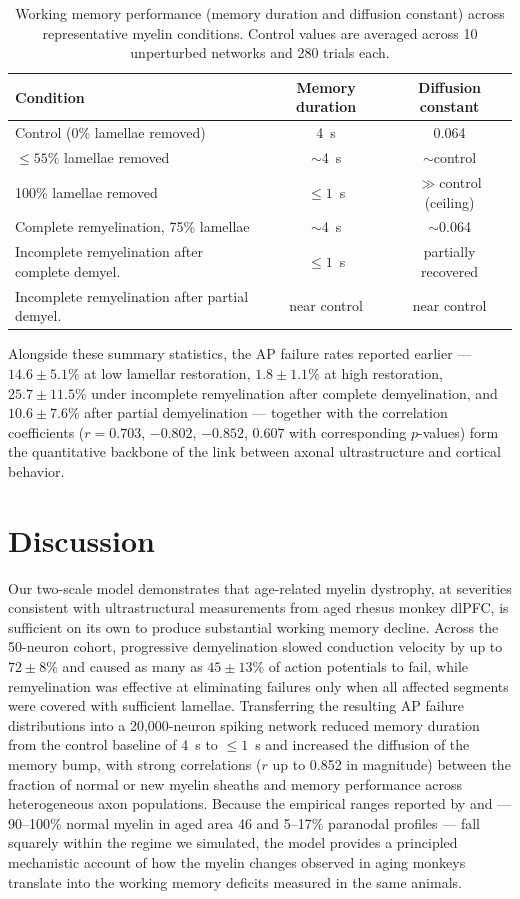 \documentclass[11pt]{article}
\begin{document}
\begin{table}[htbp]
\centering
\caption{Working memory performance (memory duration and diffusion constant) across representative myelin conditions. Control values are averaged across 10 unperturbed networks and 280 trials each.}
\label{tab:memory}
\begin{tabular}{lcc}
\toprule
Condition & Memory duration & Diffusion constant \\
\midrule
Control (0\% lamellae removed) & 4~s & 0.064 \\
$\leq 55\%$ lamellae removed & $\sim$4~s & $\sim$control \\
100\% lamellae removed & $\leq 1$~s & $\gg$control (ceiling) \\
Complete remyelination, 75\% lamellae & $\sim$4~s & $\sim$0.064 \\
Incomplete remyelination after complete demyel. & $\leq 1$~s & partially recovered \\
Incomplete remyelination after partial demyel. & near control & near control \\
\bottomrule
\end{tabular}
\end{table}

Alongside these summary statistics, the AP failure rates reported earlier --- $14.6 \pm 5.1\%$ at low lamellar restoration, $1.8 \pm 1.1\%$ at high restoration, $25.7 \pm 11.5\%$ under incomplete remyelination after complete demyelination, and $10.6 \pm 7.6\%$ after partial demyelination --- together with the correlation coefficients ($r = 0.703$, $-0.802$, $-0.852$, $0.607$ with corresponding $p$-values) form the quantitative backbone of the link between axonal ultrastructure and cortical behavior.

\section{Discussion}

Our two-scale model demonstrates that age-related myelin dystrophy, at severities consistent with ultrastructural measurements from aged rhesus monkey dlPFC, is sufficient on its own to produce substantial working memory decline. Across the 50-neuron cohort, progressive demyelination slowed conduction velocity by up to $72 \pm 8\%$ and caused as many as $45 \pm 13\%$ of action potentials to fail, while remyelination was effective at eliminating failures only when all affected segments were covered with sufficient lamellae. Transferring the resulting AP failure distributions into a 20{,}000-neuron spiking network reduced memory duration from the control baseline of 4~s to $\leq 1$~s and increased the diffusion of the memory bump, with strong correlations ($r$ up to 0.852 in magnitude) between the fraction of normal or new myelin sheaths and memory performance across heterogeneous axon populations. Because the empirical ranges reported by \citet{peters2002aging} and \citet{peters2003remyelination} --- 90--100\% normal myelin in aged area 46 and 5--17\% paranodal profiles --- fall squarely within the regime we simulated, the model provides a principled mechanistic account of how the myelin changes observed in aging monkeys translate into the working memory deficits measured in the same animals.
\end{document}
